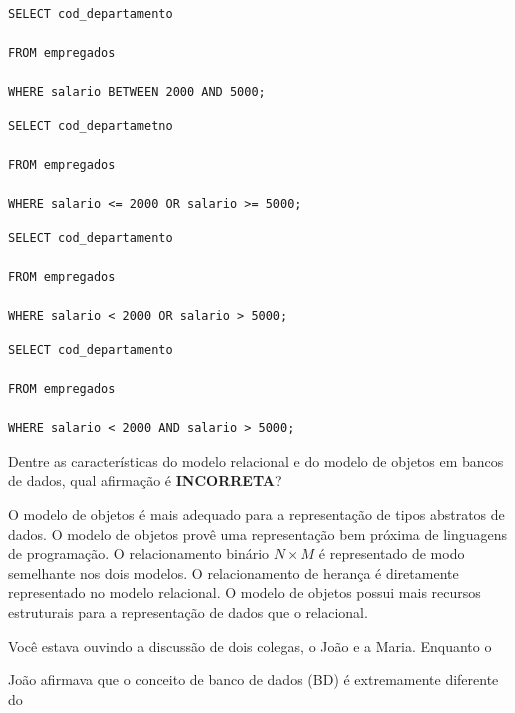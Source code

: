 \documentclass[12pt, addpoints]{exam}
\begin{document}
\begin{questions}
\begin{choices}
\choice \begin{verbatim}SELECT cod_departamento

FROM empregados

WHERE salario BETWEEN 2000 AND 5000;

\end{verbatim}


\choice \begin{verbatim}SELECT cod_departametno

FROM empregados

WHERE salario <= 2000 OR salario >= 5000;

\end{verbatim}


\choice \begin{verbatim}SELECT cod_departamento

FROM empregados

WHERE salario < 2000 OR salario > 5000;

\end{verbatim}


\choice \begin{verbatim}SELECT cod_departamento

FROM empregados

WHERE salario < 2000 AND salario > 5000;

\end{verbatim}


\end{choices}

\question

Dentre as características do modelo relacional e do modelo de objetos em bancos de dados, qual afirmação é \textbf{INCORRETA}?


\begin{choices}
\choice O modelo de objetos é mais adequado para a representação de tipos abstratos de dados.
\choice O modelo de objetos provê uma representação bem próxima de linguagens de programação.
\choice O relacionamento binário \( N \times M \) é representado de modo semelhante nos dois modelos.	
\choice O relacionamento de herança é diretamente representado no modelo relacional.
\choice O modelo de objetos possui mais recursos estruturais para a representação de dados que o relacional.
\end{choices}

\question

Você estava ouvindo a discussão de dois colegas, o João e a Maria. Enquanto o

João afirmava que o conceito de banco de dados (BD) é extremamente diferente do


\end{questions}
\end{document}
